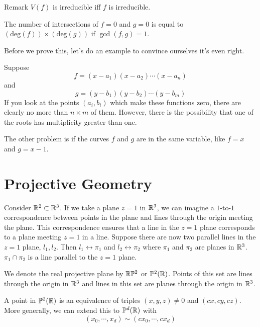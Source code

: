 \documentclass[a4paper,twoside,master.tex]{subfiles}
\begin{document}
\begin{note}{Remark}
    $ V(f) $ is irreducible iff $ f $ is irreducible.
\end{note}

\begin{theorem}
    The number of intersections of $ f = 0 $ and $ g = 0 $ is equal to $ (\text{deg}(f)) \times (\text{deg}(g)) $ if $ \gcd(f, g) = 1 $.
\end{theorem}
Before we prove this, let's do an example to convince ourselves it's even right.
\begin{ex}
    Suppose
    \begin{equation}
        f = (x - a_1)(x - a_2)\cdots(x - a_n)
    \end{equation}
    and
    \begin{equation}
        g = (y - b_1)(y - b_2)\cdots(y - b_m)
    \end{equation}
    If you look at the points $ (a_i, b_i) $ which make these functions zero, there are clearly no more than $ n \times m $ of them. However, there is the possibility that one of the roots has multiplicity greater than one.
\end{ex}

The other problem is if the curves $ f $ and $ g $ are in the same variable, like $ f = x $ and $ g = x - 1 $.

\section{Projective Geometry}\label{sec:projective_geometry}

Consider $ \mathbb{R}^2 \subset \mathbb{R}^3 $. If we take a plane $ z=1 $ in $ \mathbb{R}^3 $, we can imagine a $ 1 $-to-$ 1 $ correspondence between points in the plane and lines through the origin meeting the plane. This correspondence ensures that a line in the $ z=1 $ plane corresponds to a plane meeting $ z=1 $ in a line. Suppose there are now two parallel lines in the $ z=1 $ plane, $ l_1, l_2 $. Then $ l_1 \leftrightarrow \pi_1 $ and $ l_2 \leftrightarrow \pi_2 $ where $ \pi_1 $ and $ \pi_2 $ are planes in $ \mathbb{R}^3 $. $ \pi_1 \cap \pi_2 $ is a line parallel to the $ z=1 $ plane.

We denote the real projective plane by $ \mathbb{R}\mathbb{P}^2 $ or $ \mathbb{P}^2(\mathbb{R}) $. Points of this set are lines through the origin in $ \mathbb{R}^3 $ and lines in this set are planes through the origin in $ \mathbb{R}^3 $.

A point in $ \mathbb{P}^2(\mathbb{R}) $ is an equivalence of triples $ (x,y,z) \neq 0 $ and $ (cx, cy, cz) $. More generally, we can extend this to $ \mathbb{P}^d(\mathbb{R}) $ with
\begin{equation}
    (x_0, \cdots, x_d) \sim (cx_0, \cdots, cx_d)
\end{equation}
\end{document}
